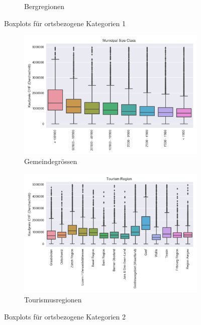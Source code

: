 \begin{figure}[h]
\begin{subfigure}{.5\textwidth}
  \caption{Bergregionen} 
\end{subfigure}
\caption{Boxplots für ortsbezogene Kategorien 1}
\end{figure}

\begin{figure}[h]
\begin{subfigure}{.5\textwidth}
  \centering
  \includegraphics[width=\linewidth]{images/anhang/analysis/boxplot_municipal_size_class_id.png}
  \caption{Gemeindegrössen}
\end{subfigure}
\begin{subfigure}{.5\textwidth}
  \centering
  \includegraphics[width=\linewidth]{images/anhang/analysis/boxplot_tourism_region_id.png}
  \caption{Tourismusregionen} 
\end{subfigure}
\caption{Boxplots für ortsbezogene Kategorien 2}
\end{figure}

